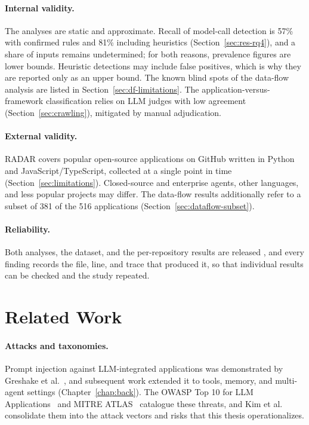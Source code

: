 \paragraph{Internal validity.} The analyses are static and approximate. Recall of model-call detection is 57\% with confirmed rules and 81\% including heuristics (Section~\ref{sec:res-rq4}), and a share of inputs remains undetermined; for both reasons, prevalence figures are lower bounds. Heuristic detections may include false positives, which is why they are reported only as an upper bound. The known blind spots of the data-flow analysis are listed in Section~\ref{sec:df-limitations}. The application-versus-framework classification relies on LLM judges with low agreement (Section~\ref{sec:crawling}), mitigated by manual adjudication.

\paragraph{External validity.} RADAR covers popular open-source applications on GitHub written in Python and JavaScript/TypeScript, collected at a single point in time (Section~\ref{sec:limitations}). Closed-source and enterprise agents, other languages, and less popular projects may differ. The data-flow results additionally refer to a subset of 381 of the 516 applications (Section~\ref{sec:dataflow-subset}).

\paragraph{Reliability.} Both analyses, the dataset, and the per-repository results are released , and every finding records the file, line, and trace that produced it, so that individual results can be checked and the study repeated.

\section{Related Work}
\label{sec:related}

\paragraph{Attacks and taxonomies.} Prompt injection against LLM-integrated applications was demonstrated by Greshake et al.~\cite{greshake}, and subsequent work extended it to tools, memory, and multi-agent settings (Chapter~\ref{chap:back}). The OWASP Top 10 for LLM Applications~\cite{owasp} and MITRE ATLAS~\cite{mitre-atlas} catalogue these threats, and Kim et al.~\cite{kim2026sok} consolidate them into the attack vectors and risks that this thesis operationalizes.

